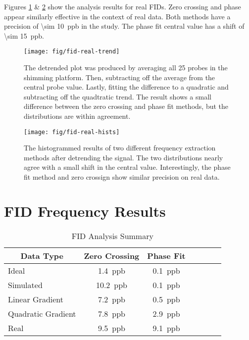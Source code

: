 Figures \ref{fig:fid-real-trend} \& \ref{fig:fid-real-hists} show the analysis results for real FIDs.  Zero crossing and phase appear similarly effective in the context of real data.  Both methods have a precision of \SI{\sim 10}{ppb} in the study.  The phase fit central value has a shift of \SI{\sim 15}{ppb}.

\begin{figure}
\label{fig:fid-real-trend}
\centering
\texttt{[image: fig/fid-real-trend]}
\caption{The detrended plot was produced by averaging all 25 probes in the shimming platform.  Then, subtracting off the average from the central probe value.  Lastly, fitting the difference to a quadratic and subtracting off the quadtratic trend.  The result shows a small difference between the zero crossing and phase fit methods, but the distributions are within agreement.}
\end{figure}

\begin{figure}
\label{fig:fid-real-hists}
\centering
\texttt{[image: fig/fid-real-hists]}
\caption{The histogrammed results of two different frequency extraction methods after detrending the signal.  The two distributions nearly agree with a small shift in the central value.  Interestingly, the phase fit method and zero crossign show similar precision on real data.}
\end{figure}

\section{FID Frequency Results}

\begin{table}[h]
\label{tab:fid-analysis-summary}
\caption{FID Analysis Summary}
\centering
\begin{tabular}{l c c c c c c}
    \hline
    \multicolumn{1}{c}{Data Type} & Zero Crossing & Phase Fit \\
    \hline
    Ideal                & \SI{1.4}{ppb} & \SI{0.1}{ppb} \\
    Simulated            & \SI{10.2}{ppb} & \SI{0.1}{ppb} \\
    Linear Gradient      & \SI{7.2}{ppb} & \SI{0.5}{ppb} \\
    Quadratic Gradient   & \SI{7.8}{ppb} & \SI{2.9}{ppb} \\
    Real                 & \SI{9.5}{ppb} & \SI{9.1}{ppb} \\
    \hline
\end{tabular}
\end{table}
